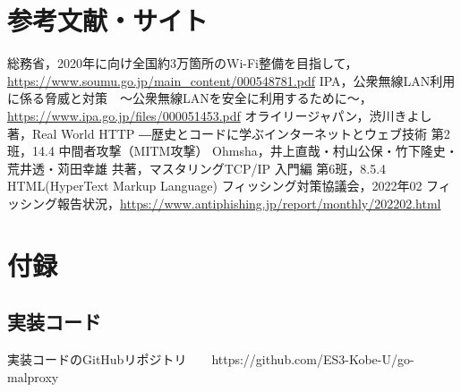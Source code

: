 \documentclass[dvipdfmx]{jsarticle}
\begin{document}
        \section{参考文献・サイト}
            \begin{thebibliography}{9}
                 総務省，2020年に向け全国約3万箇所のWi-Fi整備を目指して，\url{https://www.soumu.go.jp/main_content/000548781.pdf}
                 IPA，公衆無線LAN利用に係る脅威と対策　～公衆無線LANを安全に利用するために～，\url{https://www.ipa.go.jp/files/000051453.pdf}
                 オライリージャパン，渋川きよし 著，Real World HTTP ―歴史とコードに学ぶインターネットとウェブ技術 第2班，14.4 中間者攻撃（MITM攻撃）
                 Ohmsha，井上直哉・村山公保・竹下隆史・荒井透・苅田幸雄 共著，マスタリングTCP/IP 入門編 第6班，8.5.4 HTML(HyperText Markup Language)
                 フィッシング対策協議会，2022年02 フィッシング報告状況，\url{https://www.antiphishing.jp/report/monthly/202202.html}
            \end{thebibliography}
        
        \section{付録}
            \subsection{実装コード}
                実装コードのGitHubリポジトリ　　https://github.com/ES3-Kobe-U/go-malproxy
\end{document}
